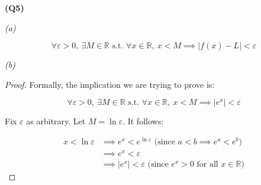 \documentclass[12pt, a4paper]{article}
\renewcommand{\epsilon}{\varepsilon}
\newcommand{\R}{\mathbb{R}}
\newcommand{\st}{\text{ s.t. }}
\begin{document}
\textbf{(Q5)}

\textit{(a)}

\[
    \forall \epsilon > 0,\: \exists M \in \R \st \forall x \in \R,\: x < M \implies |f(x) - L| < \epsilon
\]

\textit{(b)}

\begin{proof}
    Formally, the implication we are trying to prove is:

    \[
        \forall \epsilon > 0,\: \exists M \in \R \st \forall x \in \R,\: x < M \implies |e^x| < \epsilon
    \]

    Fix $\epsilon$ as arbitrary. Let $M = \ln \epsilon$. It follows:

    \begin{align*}
        x < \ln \epsilon & \implies e^x < e^{\ln \epsilon} \text{ (since $a < b \implies e^a < e^b$)}\\
        & \implies e^x < \epsilon\\
        & \implies |e^x| < \epsilon \text{ (since $e^x > 0$ for all $x \in \R$)}
    \end{align*}
\end{proof}
\end{document}
